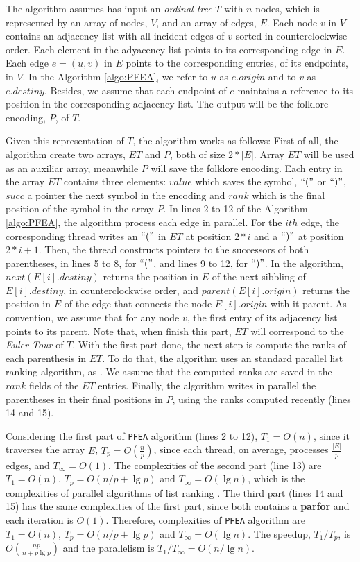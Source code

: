 The algorithm assumes has input an \emph{ordinal tree} $T$ with $n$ nodes, which is represented by an array of nodes, $V$, and an array of edges, $E$. Each node $v$ in $V$ contains an adjacency list with all incident edges of $v$ sorted in counterclockwise order. Each element in the adyacency list points to its corresponding edge in $E$. Each edge $e=(u,v)$ in $E$ points to the corresponding entries, of its endpoints, in $V$. In the Algorithm \ref{algo:PFEA}, we refer to $u$ as $e.origin$ and to $v$ as $e.destiny$. Besides, we assume that each endpoint of $e$ maintains a reference to its position in the corresponding adjacency list. The output will be the folklore encoding, $P$, of $T$.

Given this representation of $T$, the algorithm works as follows: 
First of all, the algorithm create two arrays, $ET$ and $P$, both of size $2*|E|$. Array $ET$ will be used as an auxiliar array, meanwhile $P$ will save the folklore encoding. Each entry in the array $ET$ contains three elements: $value$ which saves the symbol, $``("$ or $``)"$, $succ$ a pointer the next symbol in the encoding and $rank$ which is the final position of the symbol in the array $P$. In lines 2 to 12 of the Algorithm \ref{algo:PFEA}, the algorithm process each edge in parallel. For the $ith$ edge, the corresponding thread writes an $``("$ in $ET$ at position $2*i$ and a $``)"$ at position $2*i+1$. Then, the thread constructs pointers to the successors of both parentheses, in lines 5 to 8, for $``("$, and lines 9 to 12, for $``)"$. In the algorithm, $next(E[i].destiny)$ returns the position in $E$ of the next sibbling of $E[i].destiny$, in counterclockwise order, and $parent(E[i].origin)$ returns the position in $E$ of the edge that connects the node $E[i].origin$ with it parent. As convention, we assume that for any node $v$, the first entry of its adjacency list points to its parent. Note that, when finish this part, $ET$ will correspond to the \emph{Euler Tour} of $T$.
With the first part done, the next step is compute the ranks of each parenthesis in $ET$. To do that, the algorithm uses an standard parallel list ranking algorithm, as \cite{Helman2001265}. We assume that the computed ranks are saved in the $rank$ fields of the $ET$ entries. Finally, the algorithm writes in parallel the parentheses in their final positions in $P$, using the ranks computed recently (lines 14 and 15).

Considering the first part of {\tt PFEA} algorithm (lines 2 to 12), $T_1 = O(n)$, since it traverses the array $E$, $T_p = O(\frac{n}{p})$, since each thread, on average, processes $\frac{|E|}{p}$ edges, and $T_{\infty} = O(1)$. The complexities of the second part (line 13) are $T_1=O(n)$, $T_p=O(n/p+\lg p)$ and $T_{\infty}=O(\lg n)$, which is the complexities of parallel algorithms of list ranking . The third part (lines 14 and 15) has the same complexities of the first part, since both contains a {\bf parfor} and each iteration is $O(1)$. Therefore, complexities of {\tt PFEA} algorithm are
$T_1=O(n)$, $T_p=O(n/p+\lg p)$ and $T_{\infty}=O(\lg n)$. The speedup, $T_1/T_p$, is $O(\frac{np}{n+p\lg p})$ and the parallelism is $T_1/T_{\infty} = O(n/\lg n)$.

